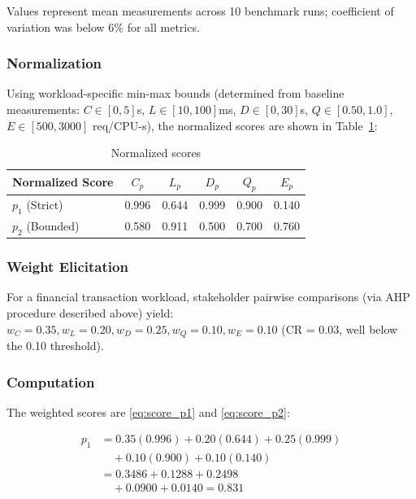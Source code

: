\documentclass[conference]{IEEEtran}
\begin{document}
{{\vspace{-2mm}\noindent\small Values represent mean measurements across 10 benchmark runs; coefficient of variation was below 6\% for all metrics.

\subsubsection{Normalization}
Using workload-specific min-max bounds (determined from baseline measurements: $C \in [0, 5]$s, $L \in [10, 100]$ms, $D \in [0, 30]$s, $Q \in [0.50, 1.0]$, $E \in [500, 3000]$ req/CPU-s), the normalized scores are shown in Table~\ref{tab:normalized-scores}:

\begin{table}[h]
\caption{Normalized scores}
\label{tab:normalized-scores}
\centering
\small
\begin{tabular}{@{}l c c c c c@{}}
\toprule
Normalized Score & $C_p$ & $L_p$ & $D_p$ & $Q_p$ & $E_p$ \\
\midrule
$p_1$ (Strict) & 0.996 & 0.644 & 0.999 & 0.900 & 0.140 \\
$p_2$ (Bounded) & 0.580 & 0.911 & 0.500 & 0.700 & 0.760 \\
\bottomrule
\end{tabular}
\end{table}

\subsubsection{Weight Elicitation}
\label{sec:ahp}
For a financial transaction workload, stakeholder pairwise comparisons (via AHP procedure described above) yield:
$w_C = 0.35, w_L = 0.20, w_D = 0.25, w_Q = 0.10, w_E = 0.10$ (CR = 0.03, well below the 0.10 threshold).

\subsubsection{Computation}

The weighted scores are \eqref{eq:score_p1} and \eqref{eq:score_p2}:

\begin{align}
p_1 &= 0.35(0.996)+0.20(0.644)+0.25(0.999) \nonumber\\
    &\quad +0.10(0.900)+0.10(0.140) \nonumber\\
    &=0.3486+0.1288+0.2498 \nonumber\\
    &\quad +0.0900+0.0140=0.831
\label{eq:score_p1}
\end{align}

}}
\end{document}
